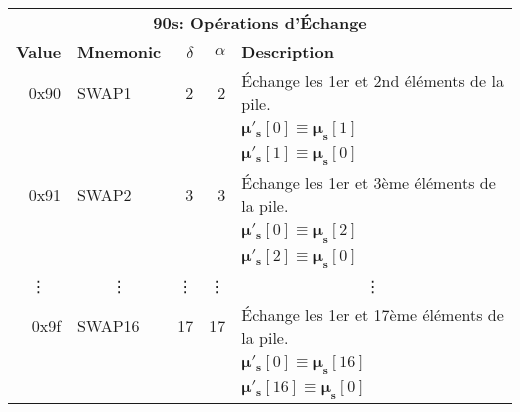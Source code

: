 \documentclass[9pt,oneside]{amsart}
\begin{document}
\begin{tabular*}{\columnwidth}[h]{rlrrl}
\toprule
\multicolumn{5}{c}{\textbf{90s: Opérations d'Échange }} \vspace{5pt} \\
\textbf{Value} & \textbf{Mnemonic} & $\delta$ & $\alpha$ & \textbf{Description} \vspace{5pt} \\
0x90 & {\small SWAP1} & 2 & 2 & Échange les 1er et 2nd éléments de la pile. \\
&&&& $\boldsymbol{\mu}'_\mathbf{s}[0] \equiv \boldsymbol{\mu}_\mathbf{s}[1]$ \\
&&&& $\boldsymbol{\mu}'_\mathbf{s}[1] \equiv \boldsymbol{\mu}_\mathbf{s}[0]$ \\
\midrule
0x91 & {\small SWAP2} & 3 & 3 & Échange les 1er et 3ème éléments de la pile. \\
&&&& $\boldsymbol{\mu}'_\mathbf{s}[0] \equiv \boldsymbol{\mu}_\mathbf{s}[2]$ \\
&&&& $\boldsymbol{\mu}'_\mathbf{s}[2] \equiv \boldsymbol{\mu}_\mathbf{s}[0]$ \\
\midrule
\multicolumn{1}{c}{\vdots} & \multicolumn{1}{c}{\vdots} & \vdots & \vdots & \multicolumn{1}{c}{\vdots} \\
\midrule
0x9f & {\small SWAP16} & 17 & 17 & Échange les 1er et 17ème éléments de la pile. \\
&&&& $\boldsymbol{\mu}'_\mathbf{s}[0] \equiv \boldsymbol{\mu}_\mathbf{s}[16]$ \\
&&&& $\boldsymbol{\mu}'_\mathbf{s}[16] \equiv \boldsymbol{\mu}_\mathbf{s}[0]$ \\
\bottomrule
\end{tabular*}
\end{document}

